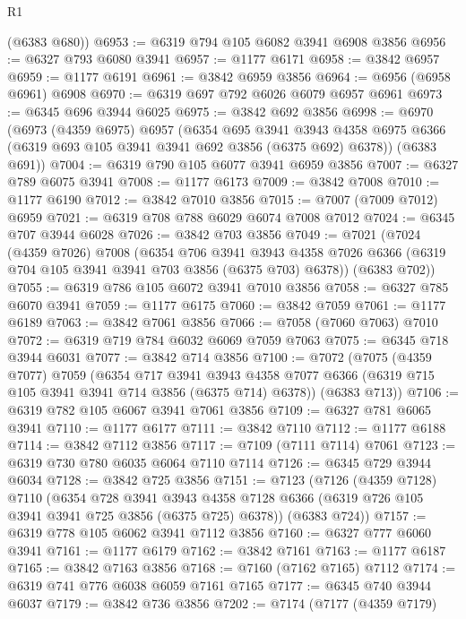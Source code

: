 \begin{lexlean}{R1}
\begin{coremodule}
      (@6383 @680))
@6953 := @6319 @794 @105 @6082 @3941 @6908 @3856
@6956 := @6327 @793 @6080 @3941
@6957 := @1177 @6171
@6958 := @3842 @6957
@6959 := @1177 @6191
@6961 := @3842 @6959 @3856
@6964 := @6956 (@6958 @6961) @6908
@6970 := @6319 @697 @792 @6026 @6079 @6957 @6961
@6973 := @6345 @696 @3944 @6025
@6975 := @3842 @692 @3856
@6998 := @6970
    (@6973
      (@4359 @6975)
      @6957
      (@6354
        @695
        @3941
        @3943
        @4358
        @6975
        @6366
        (@6319 @693 @105 @3941 @3941 @692 @3856 (@6375 @692) @6378))
      (@6383 @691))
@7004 := @6319 @790 @105 @6077 @3941 @6959 @3856
@7007 := @6327 @789 @6075 @3941
@7008 := @1177 @6173
@7009 := @3842 @7008
@7010 := @1177 @6190
@7012 := @3842 @7010 @3856
@7015 := @7007 (@7009 @7012) @6959
@7021 := @6319 @708 @788 @6029 @6074 @7008 @7012
@7024 := @6345 @707 @3944 @6028
@7026 := @3842 @703 @3856
@7049 := @7021
    (@7024
      (@4359 @7026)
      @7008
      (@6354
        @706
        @3941
        @3943
        @4358
        @7026
        @6366
        (@6319 @704 @105 @3941 @3941 @703 @3856 (@6375 @703) @6378))
      (@6383 @702))
@7055 := @6319 @786 @105 @6072 @3941 @7010 @3856
@7058 := @6327 @785 @6070 @3941
@7059 := @1177 @6175
@7060 := @3842 @7059
@7061 := @1177 @6189
@7063 := @3842 @7061 @3856
@7066 := @7058 (@7060 @7063) @7010
@7072 := @6319 @719 @784 @6032 @6069 @7059 @7063
@7075 := @6345 @718 @3944 @6031
@7077 := @3842 @714 @3856
@7100 := @7072
    (@7075
      (@4359 @7077)
      @7059
      (@6354
        @717
        @3941
        @3943
        @4358
        @7077
        @6366
        (@6319 @715 @105 @3941 @3941 @714 @3856 (@6375 @714) @6378))
      (@6383 @713))
@7106 := @6319 @782 @105 @6067 @3941 @7061 @3856
@7109 := @6327 @781 @6065 @3941
@7110 := @1177 @6177
@7111 := @3842 @7110
@7112 := @1177 @6188
@7114 := @3842 @7112 @3856
@7117 := @7109 (@7111 @7114) @7061
@7123 := @6319 @730 @780 @6035 @6064 @7110 @7114
@7126 := @6345 @729 @3944 @6034
@7128 := @3842 @725 @3856
@7151 := @7123
    (@7126
      (@4359 @7128)
      @7110
      (@6354
        @728
        @3941
        @3943
        @4358
        @7128
        @6366
        (@6319 @726 @105 @3941 @3941 @725 @3856 (@6375 @725) @6378))
      (@6383 @724))
@7157 := @6319 @778 @105 @6062 @3941 @7112 @3856
@7160 := @6327 @777 @6060 @3941
@7161 := @1177 @6179
@7162 := @3842 @7161
@7163 := @1177 @6187
@7165 := @3842 @7163 @3856
@7168 := @7160 (@7162 @7165) @7112
@7174 := @6319 @741 @776 @6038 @6059 @7161 @7165
@7177 := @6345 @740 @3944 @6037
@7179 := @3842 @736 @3856
@7202 := @7174
    (@7177
      (@4359 @7179)

\end{coremodule}
\end{lexlean}
